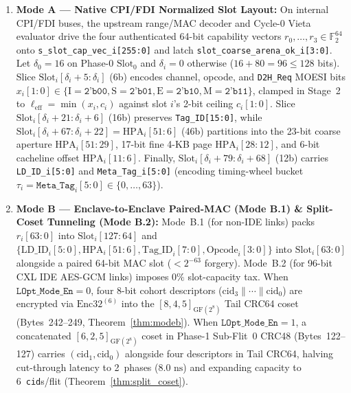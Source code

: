 \documentclass[11pt,letterpaper]{article}
\theoremstyle{spectralthm}
\begin{document}
\begin{enumerate}
  \item \textbf{Mode A --- Native CPI/FDI Normalized Slot Layout:} On internal CPI/FDI buses, the upstream range/MAC decoder and Cycle-0 Vieta evaluator drive the four authenticated 64-bit capability vectors $r_0,\ldots,r_3 \in \mathbb{F}_2^{64}$ onto \texttt{s\_slot\_cap\_vec\_i[255:0]} and latch \texttt{slot\_coarse\_arena\_ok\_i[3:0]}. Let $\delta_0 = 16$ on Phase-0 $\mathrm{Slot}_0$ and $\delta_i = 0$ otherwise ($16 + 80 = 96 \le 128$ bits). Slice $\mathrm{Slot}_i[\delta_i+5:\delta_i]$ (6b) encodes channel, opcode, and \texttt{D2H\_Req} MOESI bits $x_i[1:0] \in \{\mathrm{I}=\texttt{2'b00}, \mathrm{S}=\texttt{2'b01}, \mathrm{E}=\texttt{2'b10}, \mathrm{M}=\texttt{2'b11}\}$, clamped in Stage~2 to $\ell_{\mathrm{eff}} = \min(x_i, c_i)$ against slot $i$'s 2-bit ceiling $c_i[1:0]$. Slice $\mathrm{Slot}_i[\delta_i+21:\delta_i+6]$ (16b) preserves \texttt{Tag\_ID[15:0]}, while $\mathrm{Slot}_i[\delta_i+67:\delta_i+22] = \mathrm{HPA}_i[51:6]$ (46b) partitions into the 23-bit coarse aperture $\mathrm{HPA}_i[51:29]$, 17-bit fine 4-KB page $\mathrm{HPA}_i[28:12]$, and 6-bit cacheline offset $\mathrm{HPA}_i[11:6]$. Finally, $\mathrm{Slot}_i[\delta_i+79:\delta_i+68]$ (12b) carries \texttt{LD\_ID\_i[5:0]} and \texttt{Meta\_Tag\_i[5:0]} (encoding timing-wheel bucket $\tau_i = \texttt{Meta\_Tag}_i[5:0] \in \{0,\ldots,63\}$).
  \item \textbf{Mode B --- Enclave-to-Enclave Paired-MAC (Mode B.1) \& Split-Coset Tunneling (Mode B.2):} Mode~B.1 (for non-IDE links) packs $r_i[63:0]$ into $\mathrm{Slot}_i[127:64]$ and $\{\mathrm{LD\_ID}_i[5:0], \mathrm{HPA}_i[51:6], \mathrm{Tag\_ID}_i[7:0], \mathrm{Opcode}_i[3:0]\}$ into $\mathrm{Slot}_i[63:0]$ alongside a paired 64-bit MAC slot ($<2^{-63}$ forgery). Mode~B.2 (for 96-bit CXL IDE AES-GCM links) imposes $0\%$ slot-capacity tax. When $\texttt{LOpt\_Mode\_En} = 0$, four 8-bit cohort descriptors ($\mathrm{cid}_3 \parallel \cdots \parallel \mathrm{cid}_0$) are encrypted via $\mathrm{Enc32}^{(6)}$ into the $[8,4,5]_{\mathrm{GF}(2^8)}$ Tail CRC64 coset (Bytes~242--249, Theorem~\ref{thm:modeb}). When $\texttt{LOpt\_Mode\_En} = 1$, a concatenated $[6,2,5]_{\mathrm{GF}(2^8)}$ coset in Phase-1 Sub-Flit~0 CRC48 (Bytes~122--127) carries $(\mathrm{cid}_1, \mathrm{cid}_0)$ alongside four descriptors in Tail CRC64, halving cut-through latency to 2~phases ($8.0\text{~ns}$) and expanding capacity to 6~\texttt{cid}s/flit (Theorem~\ref{thm:split_coset}).

\end{enumerate}
\end{document}
